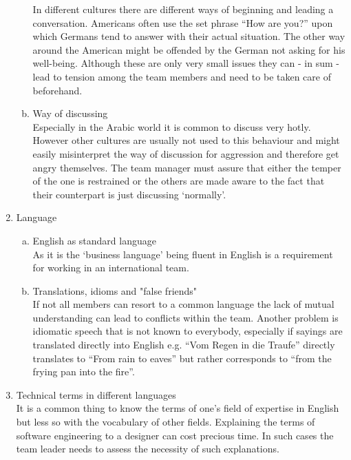 \begin{multicols}{2}
\begin{enumerate}[1.]
\begin{enumerate}[a)]
			In different cultures there are different ways of beginning and leading a conversation. Americans often use the set phrase “How are you?” upon which Germans tend to answer with their actual situation. The other way around the American might be offended by the German not asking for his well-being. Although these are only very small issues they can - in sum - lead to tension among the team members and need to be taken care of beforehand.
		  	\item Way of discussing \\
			Especially in the Arabic world it is common to discuss very hotly. However other cultures are usually not used to this behaviour and might easily misinterpret the way of discussion for aggression and therefore get angry themselves. The team  manager must assure that either the temper of the one is restrained or the others are made aware to the fact that their counterpart is just discussing ‘normally’.
		\end{enumerate}
\item Language
		\begin{enumerate}[a)]
		  \item English as standard language \\
As it is the ‘business language’ being fluent in English is a requirement for working in an international team. 
		  \item Translations, idioms and "false friends"\\
If not all members can resort to a common language the lack of mutual understanding can lead to conflicts within the team. Another problem is idiomatic speech that is not known to everybody, especially if sayings are translated directly into English e.g. “Vom Regen in die Traufe” directly translates to “From rain to eaves” but rather corresponds to “from the frying pan into the fire”.
		\end{enumerate}
	  \item Technical terms in different languages\\
It is a common thing to know the terms of one’s field of expertise in English but less so with the vocabulary of other fields. Explaining the terms of software engineering to a designer can cost precious time. In such cases the team leader needs to assess the necessity of such explanations.

\end{enumerate}
\end{multicols}
